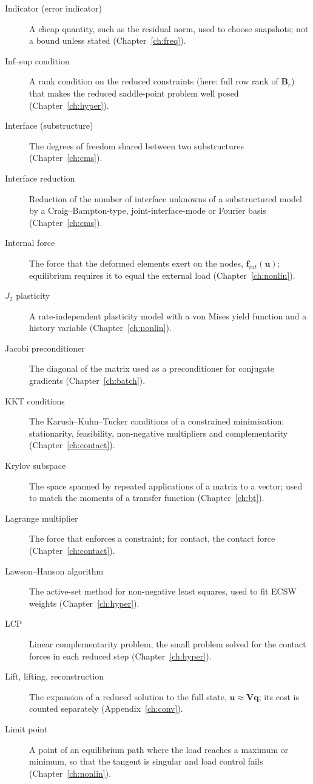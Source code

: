 \begin{description}
\item[Indicator (error indicator)] A cheap quantity, such as the residual norm, used to choose snapshots; not a bound unless stated (Chapter~\ref{ch:freq}).
\item[Inf--sup condition] A rank condition on the reduced constraints (here: full row rank of $\bm B_r$) that makes the reduced saddle-point problem well posed (Chapter~\ref{ch:hyper}).
\item[Interface (substructure)] The degrees of freedom shared between two substructures (Chapter~\ref{ch:cms}).
\item[Interface reduction] Reduction of the number of interface unknowns of a substructured model by a Craig--Bampton-type, joint-interface-mode or Fourier basis (Chapter~\ref{ch:cms}).
\item[Internal force] The force that the deformed elements exert on the nodes, $\bm f_{int}(\bm u)$; equilibrium requires it to equal the external load (Chapter~\ref{ch:nonlin}).
\item[$J_2$ plasticity] A rate-independent plasticity model with a von Mises yield function and a history variable (Chapter~\ref{ch:nonlin}).
\item[Jacobi preconditioner] The diagonal of the matrix used as a preconditioner for conjugate gradients (Chapter~\ref{ch:batch}).
\item[KKT conditions] The Karush--Kuhn--Tucker conditions of a constrained minimisation: stationarity, feasibility, non-negative multipliers and complementarity (Chapter~\ref{ch:contact}).
\item[Krylov subspace] The space spanned by repeated applications of a matrix to a vector; used to match the moments of a transfer function (Chapter~\ref{ch:bt}).
\item[Lagrange multiplier] The force that enforces a constraint; for contact, the contact force (Chapter~\ref{ch:contact}).
\item[Lawson--Hanson algorithm] The active-set method for non-negative least squares, used to fit ECSW weights (Chapter~\ref{ch:hyper}).
\item[LCP] Linear complementarity problem, the small problem solved for the contact forces in each reduced step (Chapter~\ref{ch:hyper}).
\item[Lift, lifting, reconstruction] The expansion of a reduced solution to the full state, $\bm u\approx\bm V\bm q$; its cost is counted separately (Appendix~\ref{ch:conv}).
\item[Limit point] A point of an equilibrium path where the load reaches a maximum or minimum, so that the tangent is singular and load control fails (Chapter~\ref{ch:nonlin}).

\end{description}
